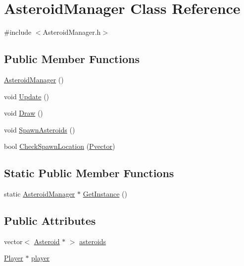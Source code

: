 \hypertarget{class_asteroid_manager}{}\section{Asteroid\+Manager Class Reference}
\label{class_asteroid_manager}


{\ttfamily \#include $<$Asteroid\+Manager.\+h$>$}

\subsection*{Public Member Functions}
\begin{DoxyCompactItemize}
\item 
\hyperlink{class_asteroid_manager_a8f60197b9c284c845a7589adf9d08e6b}{Asteroid\+Manager} ()
\item 
void \hyperlink{class_asteroid_manager_a3bf950032652d720b4e3aa9d1583cbc3}{Update} ()
\item 
void \hyperlink{class_asteroid_manager_a735c2f7d45e752d63a2106593fa73dfe}{Draw} ()
\item 
void \hyperlink{class_asteroid_manager_a4aef338a305d3a40fc345b31ba63c43c}{Spawn\+Asteroids} ()
\item 
bool \hyperlink{class_asteroid_manager_a5f989e3e36c51f4c9f2bdc7cbf6bcaee}{Check\+Spawn\+Location} (\hyperlink{class_pvector}{Pvector})
\end{DoxyCompactItemize}
\subsection*{Static Public Member Functions}
\begin{DoxyCompactItemize}
\item 
static \hyperlink{class_asteroid_manager}{Asteroid\+Manager} $\ast$ \hyperlink{class_asteroid_manager_af5c3011f97991504257e8feadbbb95d6}{Get\+Instance} ()
\end{DoxyCompactItemize}
\subsection*{Public Attributes}
\begin{DoxyCompactItemize}
\item 
vector$<$ \hyperlink{class_asteroid}{Asteroid} $\ast$ $>$ \hyperlink{class_asteroid_manager_a1a6850a31e14ab93a9b239510e4c2f8d}{asteroids}
\item 
\hyperlink{class_player}{Player} $\ast$ \hyperlink{class_asteroid_manager_a35e449894f3f0e715fd5f5aad03619d5}{player}
\end{DoxyCompactItemize}
